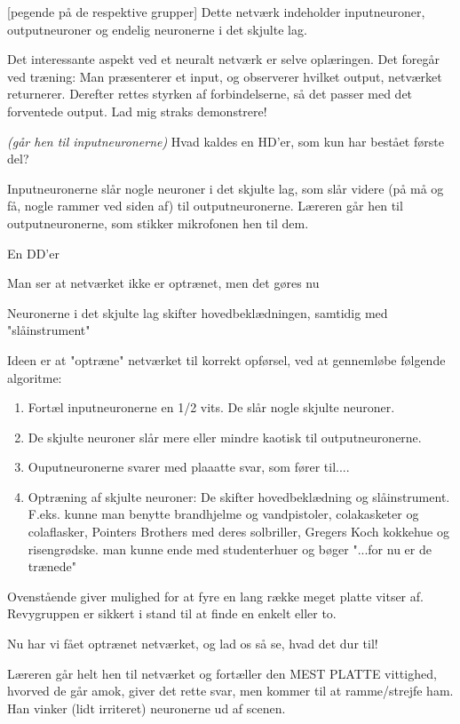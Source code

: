 \documentclass[a4paper,11pt]{article}
\begin{document}
\begin{sketch}
[pegende på de respektive grupper]
Dette netværk
indeholder inputneuroner, outputneuroner og endelig neuronerne i det
skjulte lag.

Det interessante aspekt ved et neuralt netværk er selve
oplæringen. Det foregår ved træning: Man præsenterer et input, og
observerer hvilket output, netværket returnerer. Derefter rettes
styrken af forbindelserne, så det passer med det forventede output.
Lad mig straks demonstrere!

{\em (går hen til inputneuronerne)} Hvad kaldes en HD'er, som
kun har bestået første del?

\scene 
Inputneuronerne slår nogle neuroner i det skjulte lag, som
slår videre (på må og få, nogle rammer ved siden af) til
outputneuronerne. Læreren går hen til outputneuronerne, som stikker
mikrofonen hen til dem. 

En DD'er

Man ser at netværket
ikke er optrænet, men det gøres nu

\scene
 Neuronerne i det skjulte lag
skifter hovedbeklædningen, samtidig med "slåinstrument"


Ideen er at "optræne" netværket til korrekt opførsel, ved at
gennemløbe følgende algoritme:

\begin{enumerate}
\item
 Fortæl inputneuronerne en 1/2 vits. De slår nogle skjulte
neuroner.  
\item De skjulte neuroner slår mere eller mindre kaotisk til
outputneuronerne.  
\item Ouputneuronerne svarer med plaaatte svar, som fører til....  
\item Optræning af skjulte neuroner: De skifter hovedbeklædning og
slåinstrument. F.eks. kunne man benytte brandhjelme og vandpistoler,
colakasketer og colaflasker, Pointers Brothers med deres solbriller,
Gregers Koch kokkehue og risengrødske.  man kunne ende med
studenterhuer og bøger "...for nu er de trænede"
\end{enumerate}

Ovenstående giver mulighed for at fyre en lang række meget platte
vitser af. Revygruppen er sikkert i stand til at finde en enkelt eller
to.


 Nu har vi fået optrænet netværket, og lad os så se,
hvad det dur til!

\scene Læreren går helt hen til netværket og fortæller den MEST
PLATTE vittighed, hvorved de går amok, giver det rette svar, men
kommer til at ramme/strejfe ham. Han vinker (lidt irriteret)
neuronerne ud af scenen.


\end{sketch}
\end{document}
